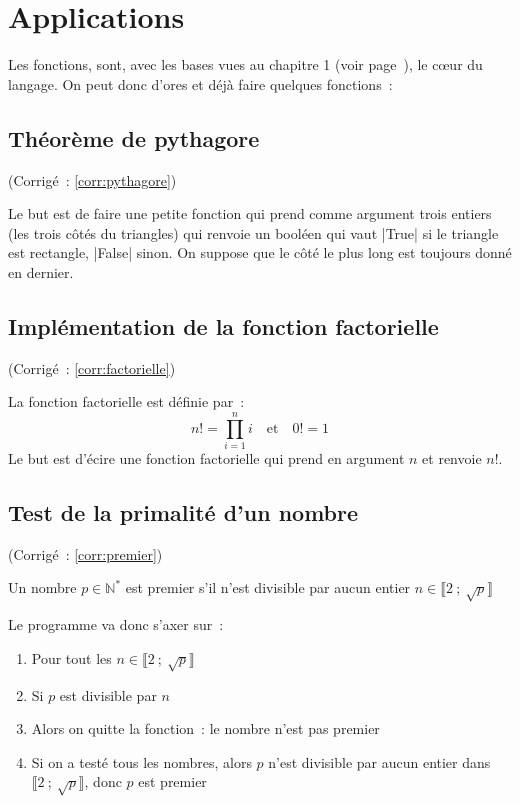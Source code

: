 \section{Applications}

		Les fonctions, sont, avec les bases vues au chapitre 1 (voir page~\pageref{chap_1}), le cœur du langage. On peut donc d'ores et déjà faire quelques fonctions~:
		
	\subsection{Théorème de pythagore} \label{appl:pythagore} (Corrigé~: \ref{corr:pythagore})
		
		Le but est de faire une petite fonction qui prend comme argument trois entiers (les trois côtés du triangles) qui renvoie un booléen qui vaut \python|True| si le triangle est rectangle, \python|False| sinon.
		On suppose que le côté le plus long est toujours donné en dernier.
		
	\subsection{Implémentation de la fonction factorielle} \label{appl:factorielle} (Corrigé~: \ref{corr:factorielle})
		
		La fonction factorielle est définie par~:
		\[
			n! = \prod_{i = 1}^n i \quad \textrm{et} \quad 0! = 1
		\]
		Le but est d'écire une fonction factorielle qui prend en argument $n$ et renvoie $n!$.
	
	\subsection{Test de la primalité d'un nombre} \label{appl:premier} (Corrigé~: \ref{corr:premier})

		Un nombre $p \in \mathbb{N}^*$ est premier s'il n'est divisible par aucun entier $n \in \llbracket 2~;\ \sqrt{p} \rrbracket$
		
		Le programme va donc s'axer sur~:
		\begin{enumerate}
			\item Pour tout les $n \in \llbracket 2~;\ \sqrt{p} \rrbracket$
			\item Si $p$ est divisible par $n$
			\item Alors on quitte la fonction~: le nombre n'est pas premier
			\item Si on a testé tous les nombres, alors $p$ n'est divisible par aucun entier dans $\llbracket 2~;\ \sqrt{p} \rrbracket$, donc $p$ est premier
		\end{enumerate}
	
